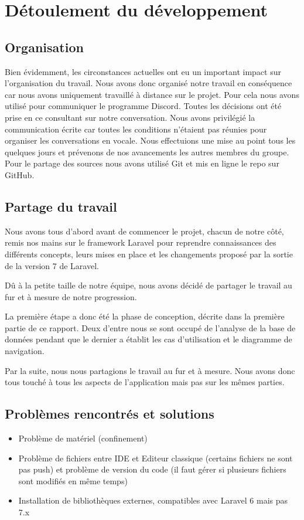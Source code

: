 \documentclass[12pt]{article}
\begin{document}
\newpage

\section{Détoulement du développement}

\subsection{Organisation}

Bien évidemment, les circonstances actuelles ont eu un important impact sur l'organisation du travail. Nous avons donc organisé notre travail en conséquence car nous avons uniquement travaillé à distance sur le projet. Pour cela nous avons utilisé pour communiquer le programme Discord. Toutes les décisions ont été prise en ce consultant sur notre conversation. Nous avons privilégié la communication écrite car toutes les conditions n'étaient pas réunies pour organiser les conversations en vocale. Nous effectuions une mise au point tous les quelques jours et prévenons de nos avancements les autres membres du groupe. Pour le partage des sources nous avons utilisé Git et mis en ligne le repo sur GitHub.

\subsection{Partage du travail}

Nous avons tous d'abord avant de commencer le projet, chacun de notre côté, remis nos mains sur le framework
Laravel pour reprendre connaissances des différents concepts, leurs mises en place et les changements proposé par la sortie de la version 7 de Laravel.

Dû à la petite taille de notre équipe, nous avons décidé de partager le travail au fur et à mesure de notre progression. 

La première étape a donc été la phase de conception, décrite dans la première partie de ce rapport. Deux d'entre nous se sont occupé de l'analyse de la base de données pendant que le dernier a établit les cas d'utilisation et le diagramme  de navigation.

Par la suite, nous nous partagions le travail au fur et à mesure. Nous avons donc tous touché à tous les aspects de l'application mais pas sur les mêmes parties.

\subsection{Problèmes rencontrés et solutions}
\begin{itemize}
\item Problème de matériel (confinement)
\item Problème de fichiers entre IDE et Editeur classique (certains fichiers ne sont pas push) et problème de version du code (il faut gérer si plusieurs fichiers sont modifiés en même temps)
\item Installation de bibliothèques externes, compatibles avec Laravel 6 mais pas 7.x
\end{itemize}
\end{document}
